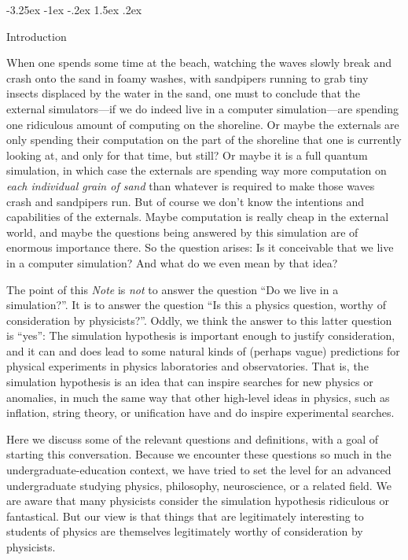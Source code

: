 \documentclass[12pt,letterpaper]{article}
\makeatletter
\renewcommand\section{\@startsection {section}{1}{\z@}%
  {-3.25ex \@plus -1ex \@minus -.2ex}%
  {1.5ex \@plus .2ex}%
  {\raggedright\normalfont\large\bfseries}}
\newcommand{\documentname}{\textsl{Note}}
\makeatother
\begin{document}
\section{Introduction}

When one spends some time at the beach, watching the waves slowly break and crash onto the sand in foamy washes, with sandpipers running to grab tiny insects displaced by the water in the sand, one must to conclude that the external simulators---if we do indeed live in a computer simulation---are spending one ridiculous amount of computing on the shoreline.
Or maybe the externals are only spending their computation on the part of the shoreline that one is currently looking at, and only for that time, but still?
Or maybe it is a full quantum simulation, in which case the externals are spending way more computation on \emph{each individual grain of sand} than whatever is required to make those waves crash and sandpipers run.
But of course we don't know the intentions and capabilities of the externals.
Maybe computation is really cheap in the external world, and maybe the questions being answered by this simulation are of enormous importance there.
So the question arises: Is it conceivable that we live in a computer simulation?
And what do we even mean by that idea?

The point of this \documentname{} is \emph{not} to answer the question ``Do we live in a simulation?''.
It is to answer the question ``Is this a physics question, worthy of consideration by physicists?''.
Oddly, we think the answer to this latter question is ``yes'':
The simulation hypothesis is important enough to justify consideration, and it can and does lead to some natural kinds of (perhaps vague) predictions for physical experiments in physics laboratories and observatories.
That is, the simulation hypothesis is an idea that can inspire searches for new physics or anomalies, in much the same way that other high-level ideas in physics, such as inflation, string theory, or unification have and do inspire experimental searches.

Here we discuss some of the relevant questions and definitions, with a goal of starting this conversation.
Because we encounter these questions so much in the undergraduate-education context, we have tried to set the level for an advanced undergraduate studying physics, philosophy, neuroscience, or a related field.
We are aware that many physicists consider the simulation hypothesis ridiculous or fantastical.
But our view is that things that are legitimately interesting to students of physics are themselves legitimately worthy of consideration by physicists.
\end{document}
